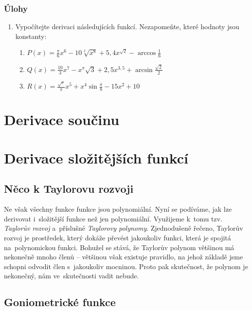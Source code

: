 \subsubsection*{Úlohy}
\begin{enumerate}
    \item Vypočítejte derivaci následujících funkcí. Nezapomeňte, které hodnoty jsou konstanty:
    \begin{enumerate}
        \item $\displaystyle P(x)
        = \frac{\pi}{6} x^6 - 10\sqrt[3]{x^8} + 5,4x^{\sqrt2} - \arccos \frac{1}{6}$
        \item $\displaystyle Q(x)
        = \frac{10}{3} x^7 - x^\pi \sqrt3 + 2,5x^{3,5} + \arcsin \frac{\sqrt2}{2}$
        \item $\displaystyle R(x)
        = \frac{\sqrt{e}}{\pi} x^5 + x^4 \sin \frac{\pi}{8} - 15x^2 + 10$
    \end{enumerate}
\end{enumerate}

\vfill{}
\pagebreak
\section{Derivace součinu}

\vfill{}
\pagebreak
\section{Derivace složitějších funkcí}

\subsection{Něco k Taylorovu rozvoji}

Ne však všechny funkce funkce jsou polynomiální. Nyní se podíváme, jak lze derivovat i~složitější funkce než jen polynomiální. Využijeme k~tomu tzv. \emph{Taylorův rozvoj} a~příslušné \emph{Taylorovy polynomy}. Zjednodušeně řečeno, Taylorův rozvoj je prostředek, který dokáže převést jakoukoliv funkci, která je spojitá na~polynomickou funkci. Bohužel se stává, že Taylorův polynom většinou má nekonečně mnoho členů -- většinou však existuje pravidlo, na jehož základě jsme schopni odvodit člen s~jakoukoliv mocninou. Proto pak skutečnost, že polynom je nekonečný, nám ve~skutečnosti vadit nebude.

\subsection{Goniometrické funkce}

